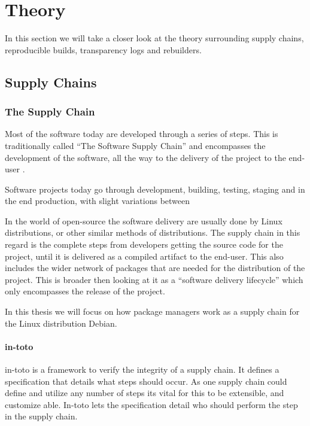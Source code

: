 \documentclass[../Main/thesis.tex]{subfiles}
\begin{document}
\chapter{Theory}
\label{ch:theory}
In this section we will take a closer look at the theory surrounding
supply chains, reproducible builds, transparency logs and rebuilders.

\section{Supply Chains}\label{sec:supply_chain}
    \subsection*{The Supply Chain}

    Most of the software today are developed through a series of steps. This is
    traditionally called ``The Software Supply Chain'' and encompasses the
    development of the software, all the way to the delivery of the project
    to the end-user \cite{rj-ellison-2010}.

    Software projects today go through development, building, testing, staging
    and in the end production, with slight variations between 

    In the world of open-source the software delivery are usually done by Linux
    distributions, or other similar methods of distributions. The supply chain
    in this regard is the complete steps from developers getting the source code
    for the project, until it is delivered as a compiled artifact to the
    end-user. This also includes the wider network of packages that are needed
    for the distribution of the project. This is broader then looking at it as a
    ``software delivery lifecycle'' which only encompasses the release of the
    project.

    In this thesis we will focus on how package managers work as a supply chain
    for the Linux distribution Debian.


    \subsubsection*{in-toto}
    in-toto is a framework to verify the integrity of a supply chain. It defines
    a specification that details what steps should occur. As one supply chain
    could define and utilize any number of steps its vital for this to be
    extensible, and customize able. In-toto lets the specification detail who
    should perform the step in the supply chain.
  
\end{document}
